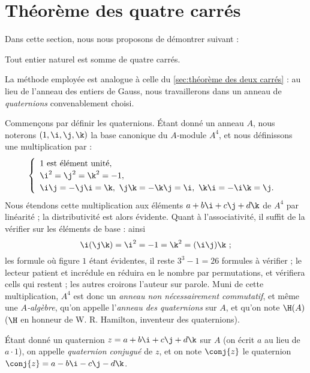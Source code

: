 \documentclass[11pt, useosf,
  title in boldface,
  theorem in new line,
  theorem numbering = section,
  number theorems separately,
]{simplivre}
\begin{document}
\pagebreak
\section{Théorème des quatre carrés}\label{sec:théorème des quatre carrés}

    Dans cette section, nous nous proposons de démontrer  suivant :
    \begin{theorem}[Lagrange]\label{thm:Lagrange;somme des quatre carrés}
        Tout entier naturel est somme de quatre carrés.
    \end{theorem}

    La méthode employée est analogue à celle du \cref{sec:théorème des deux carrés} : au lieu de l'anneau des entiers de Gauss, nous travaillerons dans un anneau de \emph{quaternions} convenablement choisi.

    Commençons par définir les quaternions. Étant donné un anneau \( A \), nous noterons \( (1,\i,\j,\k) \) la base canonique du \( A \)‑module \( A^4 \), et nous définissons une multiplication par :
    \begin{equation}\label{eq:quaternion}
        \begin{cases}
            \enspace \text{\( 1 \) est élément unité},\\
            \enspace \i^2 = \j^2 = \k^2 = -1,\\
            \enspace \i\j = -\j\i = \k, ~ \j\k=-\k\j = \i, ~ \k\i = -\i\k = \j.
        \end{cases}
    \end{equation}
    Nous étendons cette multiplication aux éléments \( a+b\i+c\j+d\k \) de \( A^4 \) par linéarité ; la distributivité est alors évidente. Quant à l'associativité, il suffit de la vérifier sur les éléments de base : ainsi
    \[
        \i(\j\k) = \i^2 = -1 = \k^2 = (\i\j)\k ~;
    \]
    les formule où figure \( 1 \) étant évidentes, il reste \( 3^3-1 = 26 \) formules à vérifier ; le lecteur patient et incrédule en réduira en le nombre par permutations, et vérifiera cells qui restent ; les autres croirons l'auteur sur parole. Muni de cette multiplication, \( A^4 \) est donc un \emph{anneau non nécessairement commutatif}, et même une \emph{\( A \)‑algèbre}, qu'on appelle l'\emph{anneau des quaternions} sur \( A \), et qu'on note \( \H(A) \) (\( \H \) en honneur de W. R. Hamilton, inventeur des quaternions).

    Étant donné un quaternion \( z = a+b\i+c\j+d\k \) sur \( A \) (on écrit \( a \) au lieu de \( a \cdot 1 \)), on appelle \emph{quaternion conjugué} de \( z \), et on note \( \conj{z} \) le quaternion \( \conj{z} = a-b\i-c\j-d\k \).
\end{document}
